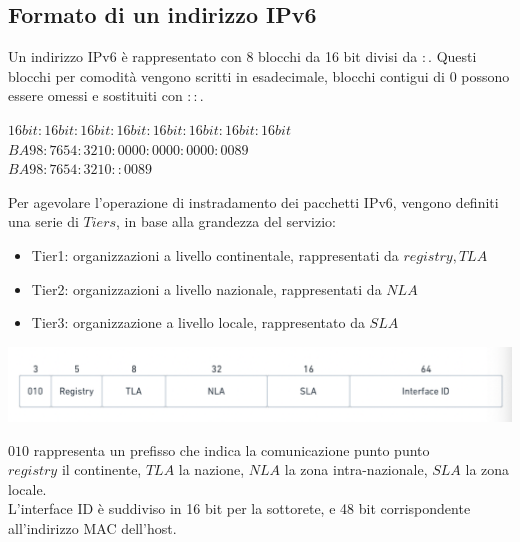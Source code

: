 \documentclass[11pt, oneside]{article}   	%
\begin{document}
\subsection*{Formato di un indirizzo IPv6}
Un indirizzo IPv6 è rappresentato con 8 blocchi da 16 bit divisi da $:$. Questi blocchi per comodità vengono scritti in esadecimale, blocchi contigui di $0$ possono essere omessi e sostituiti con $::$.
\begin{center}
$16bit:16bit:16bit:16bit:16bit:16bit:16bit:16bit$\\
$BA98 : 7654 : 3210 : 0000 : 0000 : 0000 : 0089$\\
$BA98 : 7654 : 3210 :: 0089$
\end{center}
Per agevolare l'operazione di instradamento dei pacchetti IPv6, vengono definiti una serie di $Tiers$, in base alla grandezza del servizio:
\begin{itemize}
\item Tier1: organizzazioni a livello continentale, rappresentati da $registry, TLA$
\item Tier2: organizzazioni a livello nazionale, rappresentati da $NLA$
\item Tier3: organizzazione a livello locale, rappresentato da $SLA$
\end{itemize}
\begin{center}
\includegraphics[scale=0.5]{routingtable}
\end{center}
$010$ rappresenta un prefisso che indica la comunicazione punto punto \\$registry$ il continente, $TLA$ la nazione, $NLA$ la zona intra-nazionale, $SLA$ la zona locale.\\
L'interface ID è suddiviso in 16 bit per la sottorete, e 48 bit corrispondente all'indirizzo MAC dell'host.\\\\
\end{document}
